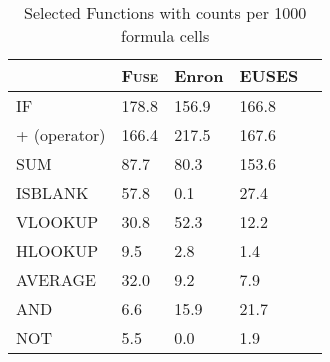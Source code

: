 \documentclass[conference]{IEEEtran}
\begin{document}
    

\begin{table}[!t]
\centering
\label{tab:selectedFunctions}

\caption{Selected Functions with counts per 1000 formula cells}
\begin{tabular}{lllll}
\toprule
 & \textbf{\textsc{Fuse}} & \textbf{Enron} & \textbf{EUSES}\\
\midrule
IF & 178.8 & 156.9 & 166.8\\
+ (operator) & 166.4 & 217.5 & 167.6\\
SUM & 87.7 & 80.3 & 153.6\\
ISBLANK & 57.8 & 0.1 & 27.4\\
VLOOKUP & 30.8 & 52.3 & 12.2\\
HLOOKUP & 9.5 & 2.8 & 1.4\\
AVERAGE & 32.0 & 9.2 & 7.9\\
AND & 6.6 & 15.9 & 21.7\\
NOT & 5.5 & 0.0 & 1.9\\
\bottomrule

\end{tabular}

\end{table}


\end{document}
